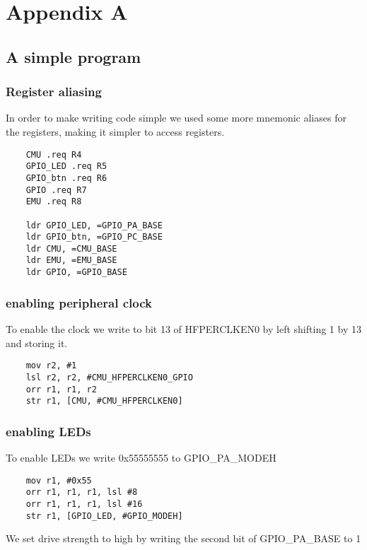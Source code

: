 \chapter{Appendix A}

\section{A simple program}

\subsection{Register aliasing}

In order to make writing code simple we used some more mnemonic aliases for the registers, making it simpler to access registers.

\begin{lstlisting}
	CMU .req R4
	GPIO_LED .req R5
	GPIO_btn .req R6
	GPIO .req R7
	EMU .req R8
	
	ldr GPIO_LED, =GPIO_PA_BASE
	ldr GPIO_btn, =GPIO_PC_BASE
	ldr CMU, =CMU_BASE
	ldr EMU, =EMU_BASE
	ldr GPIO, =GPIO_BASE
\end{lstlisting}

\subsection{enabling peripheral clock}

To enable the clock we write to bit 13 of HFPERCLKEN0 by left shifting 1 by 13 and storing it.

\begin{lstlisting}
	mov r2, #1
	lsl r2, r2, #CMU_HFPERCLKEN0_GPIO
	orr r1, r1, r2
	str r1, [CMU, #CMU_HFPERCLKEN0]	
\end{lstlisting}

\subsection{enabling LEDs}

To enable LEDs we write 0x55555555 to GPIO\_PA\_MODEH

\begin{lstlisting}
	mov r1, #0x55
	orr r1, r1, r1, lsl #8
	orr r1, r1, r1, lsl #16
	str r1, [GPIO_LED, #GPIO_MODEH]
\end{lstlisting}


We set drive strength to high by writing the second bit of GPIO\_PA\_BASE to 1

